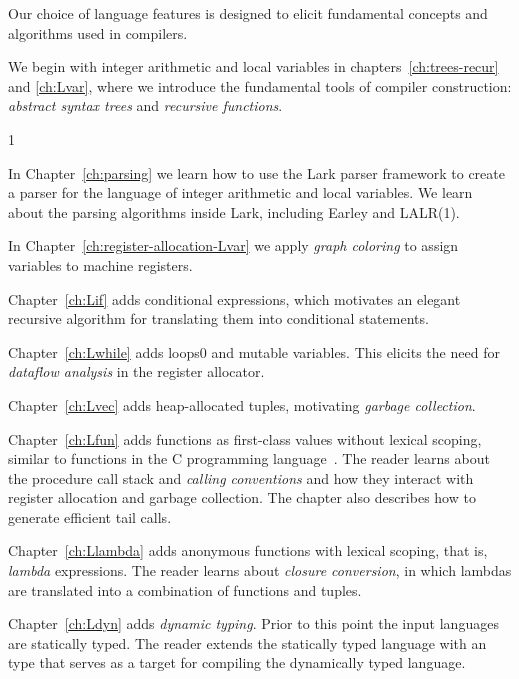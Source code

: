 \documentclass[7x10]{TimesAPriori_MIT}%
\def\racketEd{0}
\def\pythonEd{1}
\def\edition{1}
\newcommand{\racket}[1]{{\if\edition\racketEd{#1}\fi}}
\newcommand{\pythonColor}[0]{}
\numberwithin{theorem}{chapter}
\numberwithin{definition}{chapter}
\numberwithin{equation}{chapter}
\begin{document}
Our choice of language features is designed to elicit fundamental
concepts and algorithms used in compilers.
\begin{itemize}
\item We begin with integer arithmetic and local variables in
  chapters~\ref{ch:trees-recur} and \ref{ch:Lvar}, where we introduce
  the fundamental tools of compiler construction: \emph{abstract
    syntax trees} and \emph{recursive functions}. 
{\if\edition\pythonEd\pythonColor
\item In Chapter~\ref{ch:parsing} we learn how to use the Lark
  parser framework to create a parser for the language of integer
  arithmetic and local variables. We learn about the parsing
  algorithms inside Lark, including Earley and LALR(1).
%
\fi}
\item In Chapter~\ref{ch:register-allocation-Lvar} we apply
  \emph{graph coloring} to assign variables to machine registers.
\item Chapter~\ref{ch:Lif} adds conditional expressions, which
  motivates an elegant recursive algorithm for translating them into
  conditional  statements.
\item Chapter~\ref{ch:Lwhile} adds loops\racket{ and mutable
  variables}. This elicits the need for \emph{dataflow
    analysis} in the register allocator.
\item Chapter~\ref{ch:Lvec} adds heap-allocated tuples, motivating
  \emph{garbage collection}.
\item Chapter~\ref{ch:Lfun} adds functions as first-class values 
  without lexical scoping, similar to functions in the C programming
  language~\citep{Kernighan:1988nx}. The reader learns about the
  procedure call stack and \emph{calling conventions} and how they interact
  with register allocation and garbage collection. The chapter also
  describes how to generate efficient tail calls.
\item Chapter~\ref{ch:Llambda} adds anonymous functions with lexical
  scoping, that is, \emph{lambda} expressions. The reader learns about
  \emph{closure conversion}, in which lambdas are translated into a
  combination of functions and tuples.
\item Chapter~\ref{ch:Ldyn} adds \emph{dynamic typing}. Prior to this
  point the input languages are statically typed.  The reader extends
  the statically typed language with an  type that serves
  as a target for compiling the dynamically typed language.

\end{itemize}
\end{document}

